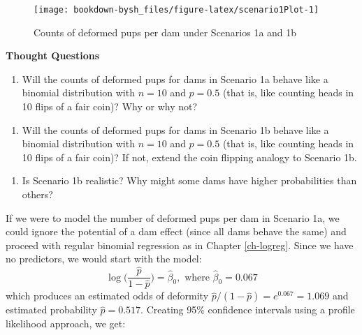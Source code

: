 \documentclass[
]{krantz}
\providecommand{\tightlist}{%
  \setlength{\itemsep}{0pt}\setlength{\parskip}{0pt}}
\renewenvironment{quote}{\begin{VF}}{\end{VF}}
\begin{document}
\begin{figure}

{\centering \texttt{[image: bookdown-bysh\_files/figure-latex/scenario1Plot-1]} 

}

\caption{Counts of deformed pups per dam under Scenarios 1a and 1b}\label{fig:scenario1Plot}
\end{figure}

\textbf{Thought Questions}

\begin{quote}
\begin{enumerate}
\def\labelenumi{\arabic{enumi}.}
\tightlist
\item
  Will the counts of deformed pups for dams in Scenario 1a behave like a binomial distribution with \(n=10\) and \(p=0.5\) (that is, like counting heads in 10 flips of a fair coin)? Why or why not?
\end{enumerate}
\end{quote}

\begin{quote}
\begin{enumerate}
\def\labelenumi{\arabic{enumi}.}
\setcounter{enumi}{1}
\tightlist
\item
  Will the counts of deformed pups for dams in Scenario 1b behave like a binomial distribution with \(n=10\) and \(p=0.5\) (that is, like counting heads in 10 flips of a fair coin)? If not, extend the coin flipping analogy to Scenario 1b.
\end{enumerate}
\end{quote}

\begin{quote}
\begin{enumerate}
\def\labelenumi{\arabic{enumi}.}
\setcounter{enumi}{2}
\tightlist
\item
  Is Scenario 1b realistic? Why might some dams have higher probabilities than others?
\end{enumerate}
\end{quote}

If we were to model the number of deformed pups per dam in Scenario 1a, we could ignore the potential of a dam effect (since all dams behave the same) and proceed with regular binomial regression as in Chapter \ref{ch-logreg}. Since we have no predictors, we would start with the model:
\begin{equation}
  \log \bigg( \frac{\hat{p}}{1-\hat{p}} \bigg) = \hat{\beta}_0, \textrm{ where } \hat{\beta}_0 = 0.067
  \label{eq:mod1aBinomial}
\end{equation}
which produces an estimated odds of deformity \(\widehat{p}/(1-\widehat{p}) = e^{0.067} = 1.069\) and estimated probability \(\widehat{p} = 0.517\). Creating 95\% confidence intervals using a profile likelihood approach, we get:
\end{document}

